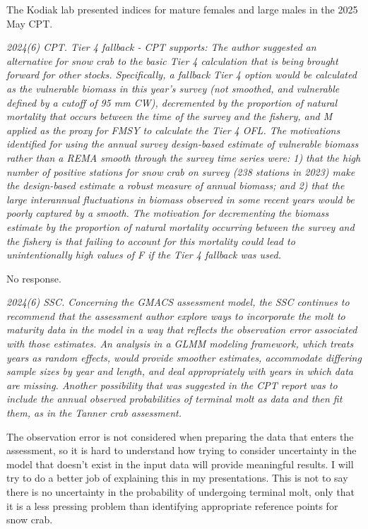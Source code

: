 \documentclass[
]{article}
\begin{document}
The Kodiak lab presented indices for mature females and large males in the 2025 May CPT.

\emph{2024(6) CPT. Tier 4 fallback - CPT supports: The author suggested an alternative for snow crab to the basic Tier 4 calculation that is being brought forward for other stocks. Specifically, a fallback Tier 4 option would be calculated as the vulnerable biomass in this year's survey (not smoothed, and vulnerable defined by a cutoff of 95 mm CW), decremented by the proportion of natural mortality that occurs between the time of the survey and the fishery, and M applied as the proxy for FMSY to calculate the Tier 4 OFL. The motivations identified for using the annual survey design-based estimate of vulnerable biomass rather than a REMA smooth through the survey time series were: 1) that the high number of positive stations for snow crab on survey (238 stations in 2023) make the design-based estimate a robust measure of annual biomass; and 2) that the large interannual fluctuations in biomass observed in some recent years would be poorly captured by a smooth. The motivation for decrementing the biomass estimate by the proportion of natural mortality occurring between the survey and the fishery is that failing to account for this mortality could lead to unintentionally high values of F if the Tier 4 fallback was used.}

No response.

\emph{2024(6) SSC. Concerning the GMACS assessment model, the SSC continues to recommend that the assessment author explore ways to incorporate the molt to maturity data in the model in a way that reflects the observation error associated with those estimates. An analysis in a GLMM modeling framework, which treats years as random effects, would provide smoother estimates, accommodate differing sample sizes by year and length, and deal appropriately with years in which data are missing. Another possibility that was suggested in the CPT report was to include the annual observed probabilities of terminal molt as data and then fit them, as in the Tanner crab assessment.}

The observation error is not considered when preparing the data that enters the assessment, so it is hard to understand how trying to consider uncertainty in the model that doesn't exist in the input data will provide meaningful results. I will try to do a better job of explaining this in my presentations. This is not to say there is no uncertainty in the probability of undergoing terminal molt, only that it is a less pressing problem than identifying appropriate reference points for snow crab.
\end{document}
